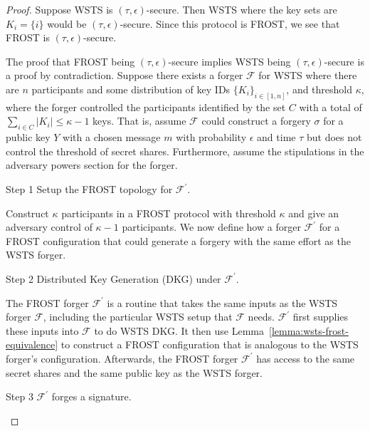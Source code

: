 \documentclass{article}
\begin{document}
\begin{proof}
Suppose WSTS is $(\tau, \epsilon)$-secure. Then WSTS where the key sets are $K_i = \{i\}$ would be $(\tau, \epsilon)$-secure. Since this protocol is FROST, we see that FROST is $(\tau, \epsilon)$-secure.

The proof that FROST being $(\tau, \epsilon)$-secure implies WSTS being $(\tau, \epsilon)$-secure is a proof by contradiction. Suppose there exists a forger $\mathcal{F}$ for WSTS where there are $n$ participants and some distribution of key IDs $\{ K_i\}_{i\in [1, n]}$, and threshold $\kappa$, where the forger controlled the participants identified by the set $C$ with a total of $\sum_{i \in C}|K_i| \leq \kappa - 1$ keys. That is, assume $\mathcal{F}$ could construct a forgery $\sigma$ for a public key $Y$ with a chosen message $m$ with probability $\epsilon$ and time $\tau$ but does not control the threshold of secret shares. Furthermore, assume the stipulations in the adversary powers section for the forger.

\begin{setup}{Step 1}
    Setup the FROST topology for $\mathcal{F}^\prime$.
\end{setup}

Construct $\kappa$ participants in a FROST protocol with threshold $\kappa$ and give an adversary control of $\kappa - 1$ participants. We now define how a forger $\mathcal{F}^\prime$ for a FROST configuration that could generate a forgery with the same effort as the WSTS forger.

\begin{setup}{Step 2}
    Distributed Key Generation (DKG) under $\mathcal{F}^\prime$.
\end{setup}

The FROST forger $\mathcal{F}^\prime$ is a routine that takes the same inputs as the WSTS forger $\mathcal{F}$, including the particular WSTS setup that $\mathcal{F}$ needs. $\mathcal{F}^\prime$ first supplies these inputs into $\mathcal{F}$ to do WSTS DKG. It then use Lemma~\ref{lemma:wsts-frost-equivalence} to construct a FROST configuration that is analogous to the WSTS forger's configuration. Afterwards, the FROST forger $\mathcal{F}^\prime$ has access to the same secret shares and the same public key as the WSTS forger.

\begin{setup}{Step 3}
    $\mathcal{F}^\prime$ forges a signature.
\end{setup}


\end{proof}
\end{document}

